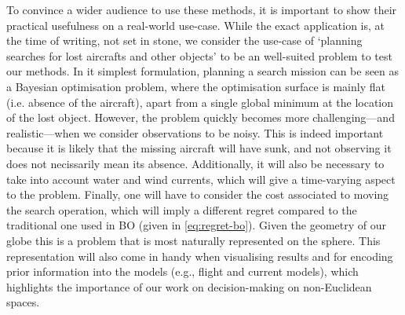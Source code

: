 To convince a wider audience to use these methods, it is important to show their practical usefulness on a real-world use-case. While the exact application is, at the time of writing, not set in stone, we consider the use-case of `planning searches for lost aircrafts and other objects' \citep{stone2014search} to be an well-suited problem to test our methods. In it simplest formulation, planning a search mission can be seen as a Bayesian optimisation problem, where the optimisation surface is mainly flat (i.e. absence of the aircraft), apart from a single global minimum at the location of the lost object. However, the problem quickly becomes more challenging---and realistic---when we consider observations to be noisy. This is indeed important because it is likely that the missing aircraft will have sunk, and not observing it does not necissarily mean its absence. Additionally, it will also be necessary to take into account water and wind currents, which will give a time-varying aspect to the problem. Finally, one will have to consider the cost associated to moving the search operation, which will imply a different regret compared to the traditional one used in BO (given in \cref{eq:regret-bo}). Given the geometry of our globe this is a problem that is most naturally represented on the sphere. This representation will also come in handy when visualising results and for encoding prior information into the models (e.g., flight and current models), which highlights the importance of our work on decision-making on non-Euclidean spaces.







